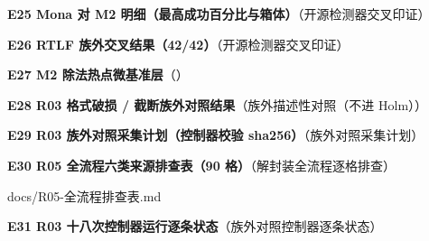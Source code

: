 \documentclass[UTF8,fontset=fandol,11pt,a4paper]{ctexart}
\begin{document}
\begin{samepage}\noindent\textbf{E25 Mona 对 M2 明细（最高成功百分比与箱体）}（开源检测器交叉印证）\par\noindent {}\par\vspace{1.5mm}\end{samepage}
\begin{samepage}\noindent\textbf{E26 RTLF 族外交叉结果（42/42）}（开源检测器交叉印证）\par\noindent {}\par\vspace{1.5mm}\end{samepage}
\begin{samepage}\noindent\textbf{E27 M2 除法热点微基准层}（\texttt{}）\par\noindent {}\par\vspace{1.5mm}\end{samepage}
\begin{samepage}\noindent\textbf{E28 R03 格式破损 / 截断族外对照结果}（族外描述性对照（不进 Holm））\par\noindent {}\par\vspace{1.5mm}\end{samepage}
\begin{samepage}\noindent\textbf{E29 R03 族外对照采集计划（控制器校验 sha256）}（族外对照采集计划）\par\noindent {}\par\vspace{1.5mm}\end{samepage}
\begin{samepage}\noindent\textbf{E30 R05 全流程六类来源排查表（90 格）}（解封装全流程逐格排查）\par\noindent docs/R05-全流程排查表.md\par\vspace{1.5mm}\end{samepage}
\begin{samepage}\noindent\textbf{E31 R03 十八次控制器运行逐条状态}（族外对照控制器逐条状态）\par\noindent {}\par\vspace{1.5mm}\end{samepage}
\end{document}

